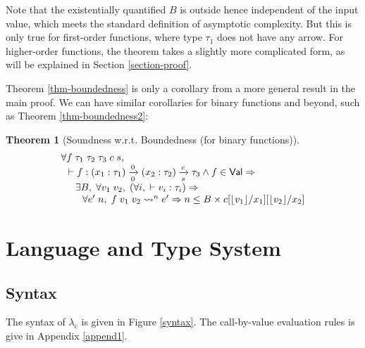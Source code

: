 \documentclass[preprint]{sigplanconf}
\newcommand{\arrow}[4]{#1\xrightarrow[#3]{#2}#4}
\newcommand{\vtos}[1]{\lfloor #1 \rfloor}
\newcommand{\logo}{\lambda_\mathrm{c}}
\newtheorem{thm}{Theorem}
\begin{document}
Note that the existentially quantified $B$ is outside hence independent of the input value, which meets the standard definition of asymptotic complexity. But this is only true for first-order functions, where type $\tau_1$ does not have any arrow. For higher-order functions, the theorem takes a slightly more complicated form, as will be explained in Section \ref{section-proof}.

Theorem \ref{thm-boundedness} is only a corollary from a more general result in the main proof. We can have similar corollaries for binary functions and beyond, such as Theorem \ref{thm-boundedness2}:

\begin{thm}[\label{thm-boundedness2}Soundness w.r.t. Boundedness (for binary functions)]
$$
\begin{array}{l}
\forall f\;\tau_1\;\tau_2\;\tau_3\;c\;s, \\
\hspace{0.1in} \vdash f:\arrow{(x_1:\tau_1)}{0}{0}{\arrow{(x_2:\tau_2)}{c}{s}{\tau_3}} \wedge f\in\mathsf{Val}\Rightarrow \\
\hspace{0.2in} \exists B, \;\forall v_1\;v_2,\; (\forall i,\;\vdash v_i:\tau_i) \Rightarrow \\
\hspace{0.3in} \forall e'\;n,\; f\;v_1\;v_2\leadsto^n e' \Rightarrow n\leq B\times c[\vtos{v_1}/x_1][\vtos{v_2}/x_2]
\end{array}
$$
\end{thm}

\section{\label{section-lang}Language and Type System}

\subsection{Syntax}

The syntax of $\logo$ is given in Figure \ref{syntax}. The call-by-value evaluation rules is give in Appendix \ref{append1}. 
\end{document}
